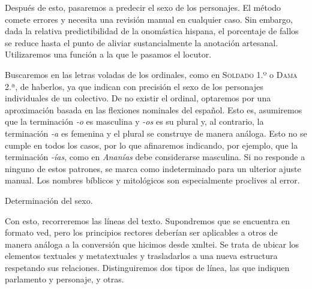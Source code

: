 Después de esto, pasaremos a predecir el sexo de los personajes. El método comete errores y necesita una revisión manual en cualquier caso. Sin embargo, dada la relativa predictibilidad de la onomástica hispana, el porcentaje de fallos se reduce hasta el punto de aliviar sustancialmente la anotación artesanal. Utilizaremos una función a la que le pasamos el locutor.

Buscaremos en las letras voladas de los ordinales, como en \textsc{Soldado} 1.º o \textsc{Dama} 2.ª, de haberlos, ya que indican con precisión el sexo de los personajes individuales de un colectivo. De no existir el ordinal, optaremos por una aproximación basada en las flexiones nominales del español. Esto es, asumiremos que la terminación \textit{-o} es masculina y \textit{-os} es su plural y, al contrario, la terminación \textit{-a} es femenina y el plural se construye de manera análoga. Esto no se cumple en todos los casos, por lo que afinaremos indicando, por ejemplo, que la terminación \textit{-ías}, como en \textit{Ananías} debe considerarse masculina. Si no responde a ninguno de estos patrones, se marca como indeterminado para un ulterior ajuste manual. Los nombres bíblicos y mitológicos son especialmente proclives al error.

\begin{algorithm}[!ht]
	\caption{Determinación del sexo.}\label{list:normal2}
\end{algorithm}

Con esto, recorreremos las líneas del texto. Supondremos que se encuentra en formato \ac{ved}, pero los principios rectores deberían ser aplicables a otros de manera análoga a la conversión que hicimos desde \ac{xmltei}. Se trata de ubicar los elementos textuales y metatextuales y trasladarlos a una nueva estructura respetando sus relaciones. Distinguiremos dos tipos de línea, las que indiquen parlamento y personaje, y otras.

